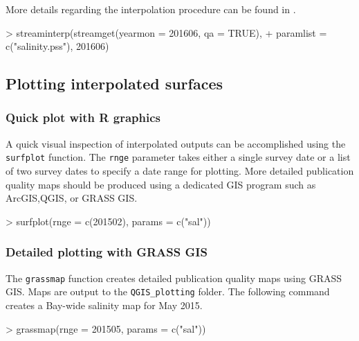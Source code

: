 \documentclass[12pt]{article}
\begin{document}
More details regarding the interpolation procedure can be found in \cite{stachelek2015application}.

\begin{Schunk}
\begin{Sinput}
> streaminterp(streamget(yearmon = 201606, qa = TRUE),
+   paramlist = c("salinity.pss"), 201606)
\end{Sinput}
\end{Schunk}

\subsection{\label{sec:plottingsurf}Plotting interpolated surfaces}

\subsubsection{Quick plot with R graphics}

A quick visual inspection of interpolated outputs can be accomplished using the \nohyphens{\texttt{surfplot}} function. The \texttt{rnge} parameter takes either a single survey date or a list of two survey dates to specify a date range for plotting. More detailed publication quality maps should be produced using a dedicated GIS program such as ArcGIS,QGIS, or GRASS GIS.

\begin{Schunk}
\begin{Sinput}
> surfplot(rnge = c(201502), params = c("sal"))
\end{Sinput}
\end{Schunk}



\subsubsection{Detailed plotting with GRASS GIS}

The \texttt{grassmap} function creates detailed publication quality maps using GRASS GIS. Maps are output to the \verb|QGIS_plotting| folder. The following command creates a Bay-wide salinity map for May 2015.

\begin{Schunk}
\begin{Sinput}
> grassmap(rnge = 201505, params = c("sal"))
\end{Sinput}
\end{Schunk}
\end{document}
